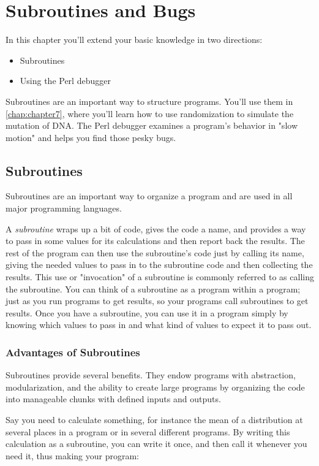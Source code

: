 \chapter{Subroutines and Bugs}
\label{chap:chapter6}
\minitoc

In this chapter you'll extend your basic knowledge in two directions:

\begin{itemize}
  \item Subroutines
  \item Using the Perl debugger
\end{itemize}

Subroutines are an important way to structure programs. You'll use them
in \autoref{chap:chapter7}, where you'll learn how to use randomization to simulate the mutation of DNA. The Perl debugger examines a program's behavior in "slow motion" and helps you find those pesky bugs. 

\section{Subroutines}
Subroutines are an important way to organize a program and are used in all major programming languages.

A \textit{subroutine} wraps up a bit of code, gives the code a name, and provides a way to pass in some values for its calculations and then report back the results. The rest of the program can then use the subroutine's code just by calling its name, giving the needed values to pass in to the subroutine code and then collecting the results. This use or "invocation" of a subroutine is commonly referred to as calling the subroutine. You can think of a subroutine as a program within a program; just as you run programs to get results, so your programs call subroutines to get results. Once you have a subroutine, you can use it in a program simply by knowing which values to pass in and what kind of values to expect it to pass out. 

\subsection{Advantages of Subroutines}
Subroutines provide several benefits. They endow programs with abstraction, modularization, and the ability to create large programs by organizing the code into manageable chunks with defined inputs and outputs.

Say you need to calculate something, for instance the mean of a distribution at several places in a program or in several different programs. By writing this calculation as a subroutine, you can write it once, and then call it whenever you need it, thus making your program: 

